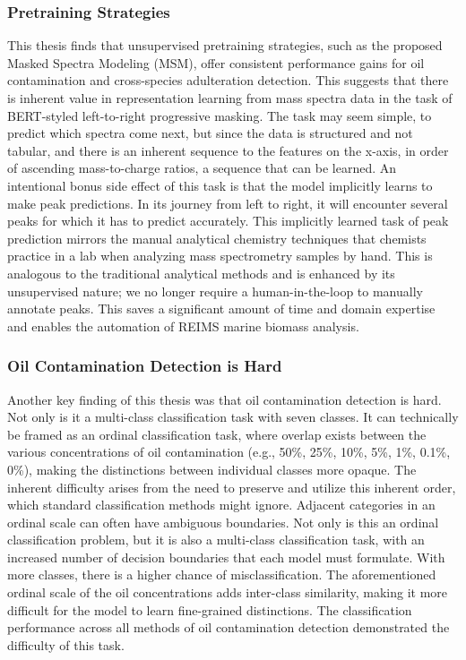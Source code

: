 \subsubsection{Pretraining Strategies}

This thesis finds that unsupervised pretraining strategies, such as the proposed Masked Spectra Modeling (MSM), offer consistent performance gains for oil contamination and cross-species adulteration detection. This suggests that there is inherent value in representation learning from mass spectra data in the task of BERT-styled left-to-right progressive masking. The task may seem simple, to predict which spectra come next, but since the data is structured and not tabular, and there is an inherent sequence to the features on the x-axis, in order of ascending mass-to-charge ratios, a sequence that can be learned. An intentional bonus side effect of this task is that the model implicitly learns to make peak predictions. In its journey from left to right, it will encounter several peaks for which it has to predict accurately. This implicitly learned task of peak prediction mirrors the manual analytical chemistry techniques that chemists practice in a lab when analyzing mass spectrometry samples by hand. This is analogous to the traditional analytical methods and is enhanced by its unsupervised nature; we no longer require a human-in-the-loop to manually annotate peaks. This saves a significant amount of time and domain expertise and enables the automation of REIMS marine biomass analysis.

\subsubsection{Oil Contamination Detection is Hard}

Another key finding of this thesis was that oil contamination detection is hard. Not only is it a multi-class classification task with seven classes. It can technically be framed as an ordinal classification task, where overlap exists between the various concentrations of oil contamination (e.g., 50\%, 25\%, 10\%, 5\%, 1\%, 0.1\%, 0\%), making the distinctions between individual classes more opaque. The inherent difficulty arises from the need to preserve and utilize this inherent order, which standard classification methods might ignore. Adjacent categories in an ordinal scale can often have ambiguous boundaries. Not only is this an ordinal classification problem, but it is also a multi-class classification task, with an increased number of decision boundaries that each model must formulate. With more classes, there is a higher chance of misclassification. The aforementioned ordinal scale of the oil concentrations adds inter-class similarity, making it more difficult for the model to learn fine-grained distinctions. The classification performance across all methods of oil contamination detection demonstrated the difficulty of this task.

